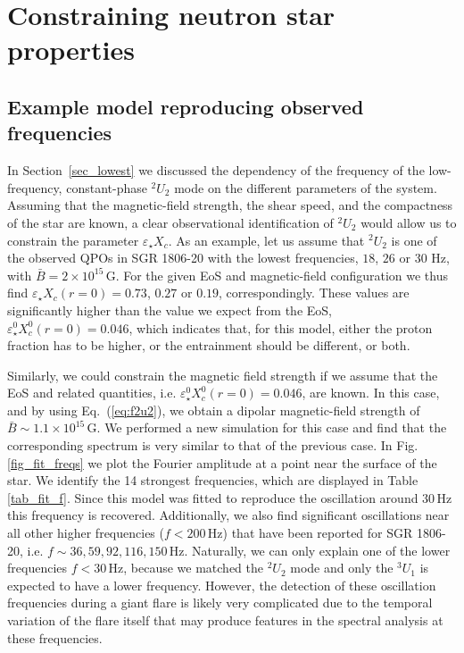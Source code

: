 \documentclass[useAMS,usenatbib]{mnras}
\begin{document}
%
\section{Constraining neutron star properties}\label{sec_constraints}

\subsection{Example model reproducing observed frequencies}

In Section~\ref{sec_lowest} we  discussed the dependency of the frequency of the 
low-frequency, constant-phase $^2U_2$ mode on the different parameters of 
the system. Assuming that  the magnetic-field strength, the shear speed, and the 
compactness of the star are known, a clear observational identification of 
$^2U_2$ would allow us to constrain the parameter $\varepsilon_\star X_c$. 
As an example, let us assume that $^2U_2$ is one of the observed QPOs 
in SGR 1806-20 with the lowest frequencies, $18$, $26$ or $30$ Hz,  
with $\bar B=2\times10^{15}\,$G. For the given EoS and magnetic-field 
configuration we thus find $\varepsilon_\star X_c(r=0)=0.73$, $0.27$ or $0.19$, 
correspondingly. These values are significantly higher than 
the value  we expect from the EoS, $\varepsilon_\star^0 X^0_c(r=0)=0.046$, which 
indicates that, for this model, either the proton fraction has to be higher, or 
the entrainment should be different, or both. 

Similarly, we could constrain the magnetic field strength if we assume that the 
EoS and related quantities, i.e. $\varepsilon_\star^0 X^0_c(r=0)=0.046$, are 
known. In this case, and by using Eq.~(\ref{eq:f2u2}), we obtain a dipolar 
magnetic-field strength of $\bar B\sim1.1\times10^{15}\,$G. We
performed a new simulation for this case and find that the corresponding 
spectrum is very 
similar to that of the previous case. In Fig.\,\ref{fig_fit_freqs} we plot the Fourier amplitude at a point 
near the surface of the star. We identify the 14 strongest frequencies, which 
are displayed in Table\,\ref{tab_fit_f}. Since this model was fitted to 
reproduce 
the oscillation around $30\,$Hz this frequency is recovered. Additionally, we 
also find significant oscillations near all other higher frequencies 
($f<200\,$Hz) that have been reported for SGR 1806-20, i.e. $f\sim36, 
59, 92, 116, 150\,$Hz. Naturally, we can only explain one of the lower 
frequencies $f<30\,$Hz, because we matched the $^2U_2$ mode and only the $^3U_1$ 
is expected to have a lower frequency. However, the detection of these 
oscillation frequencies during a giant flare is likely very complicated due to 
the temporal variation of the flare itself that may produce features in the 
spectral analysis at these frequencies. 
\end{document}
